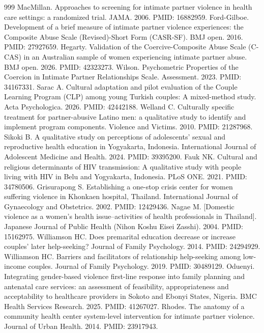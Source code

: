 \documentclass[11pt]{article}
\begin{document}
\begin{thebibliography}{999}
 MacMillan. Approaches to screening for intimate partner violence in health care settings: a randomized trial. JAMA. 2006. PMID: 16882959.
 Ford-Gilboe. Development of a brief measure of intimate partner violence experiences: the Composite Abuse Scale (Revised)-Short Form (CASR-SF). BMJ open. 2016. PMID: 27927659.
 Hegarty. Validation of the Coercive-Composite Abuse Scale (C-CAS) in an Australian sample of women experiencing intimate partner abuse. BMJ open. 2026. PMID: 42323273.
 Wilson. Psychometric Properties of the Coercion in Intimate Partner Relationships Scale. Assessment. 2023. PMID: 34167331.
 Sarac A. Cultural adaptation and pilot evaluation of the Couple Learning Program (CLP) among young Turkish couples: A mixed-method study. Acta Psychologica. 2026. PMID: 42442188.
 Welland C. Culturally specific treatment for partner-abusive Latino men: a qualitative study to identify and implement program components. Violence and Victims. 2010. PMID: 21287968.
 Sikoki B. A qualitative study on perceptions of adolescents' sexual and reproductive health education in Yogyakarta, Indonesia. International Journal of Adolescent Medicine and Health. 2024. PMID: 39395200.
 Fauk NK. Cultural and religious determinants of HIV transmission: A qualitative study with people living with HIV in Belu and Yogyakarta, Indonesia. PLoS ONE. 2021. PMID: 34780506.
 Grisurapong S. Establishing a one-stop crisis center for women suffering violence in Khonkaen hospital, Thailand. International Journal of Gynaecology and Obstetrics. 2002. PMID: 12429436.
 Nagae M. [Domestic violence as a women's health issue--activities of health professionals in Thailand]. Japanese Journal of Public Health (Nihon Koshu Eisei Zasshi). 2004. PMID: 15162975.
 Williamson HC. Does premarital education decrease or increase couples' later help-seeking? Journal of Family Psychology. 2014. PMID: 24294929.
 Williamson HC. Barriers and facilitators of relationship help-seeking among low-income couples. Journal of Family Psychology. 2019. PMID: 30489129.
 Oduenyi. Integrating gender-based violence first-line response into family planning and antenatal care services: an assessment of feasibility, appropriateness and acceptability to healthcare providers in Sokoto and Ebonyi States, Nigeria. BMC Health Services Research. 2025. PMID: 41267027.
 Rhodes. The anatomy of a community health center system-level intervention for intimate partner violence. Journal of Urban Health. 2014. PMID: 23917943.

\end{thebibliography}
\end{document}
